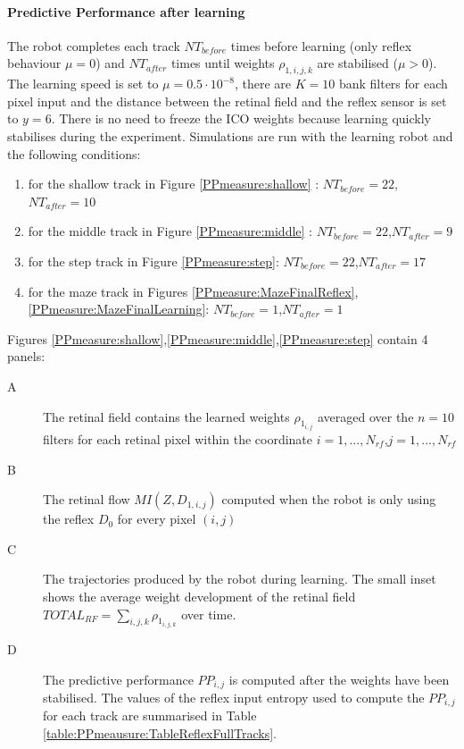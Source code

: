 \paragraph{Predictive Performance after learning}
The robot completes each track $NT_{before}$ times before learning
(only reflex behaviour $\mu=0$) and $NT_{after}$ times until weights $\rho_{1,i,j,k}$
are stabilised ($\mu>0$).
The learning speed is set to $\mu=0.5 \cdot 10 ^{-8}$, there are $K=10$ bank filters
for each pixel input and the distance between the retinal field and the reflex sensor
is set to $y=6$.
There is no need to freeze the ICO weights because learning quickly stabilises
during the experiment.
Simulations are run with the learning robot and the following conditions:
\begin{enumerate}
\item for the shallow track in Figure \ref{PPmeasure:shallow} : $NT_{before}=22$,$NT_{after}=10$ 
\item for the middle track in Figure \ref{PPmeasure:middle} : $NT_{before}=22$,$NT_{after}=9$ 
\item for the step track in Figure \ref{PPmeasure:step}: $NT_{before}=22$,$NT_{after}=17$ 
\item for the maze track in Figures  \ref{PPmeasure:MazeFinalReflex},\ref{PPmeasure:MazeFinalLearning}: $NT_{before}=1$,$NT_{after}=1$ 
\end{enumerate}
Figures \ref{PPmeasure:shallow},\ref{PPmeasure:middle},\ref{PPmeasure:step} contain 4 panels:
\begin{description}
 \item[A] The retinal field contains the learned weights $\rho_{1_{i,j}}$ averaged over the $n=10$ filters for each retinal pixel within the coordinate $i=1,...,N_{rf}$,$j=1,...,N_{rf}$
 \item[B] The retinal flow $MI(Z,D_{1,i,j})$ computed when the robot is only using the reflex $D_0$ for every pixel $(i,j)$
 \item[C] The trajectories produced by the robot during learning. The small inset shows the average weight development of the retinal field $TOTAL_{RF}=\sum_{i,j,k} \rho_{1_{i,j,k}}$ over time.
 \item[D] The predictive performance $PP_{i,j}$ is computed after the weights have been stabilised.
	  The values of the reflex input entropy used to compute the $PP_{i,j}$ for each track are 
          summarised in Table \ref{table:PPmeausure:TableReflexFullTracks}.
\end{description}

